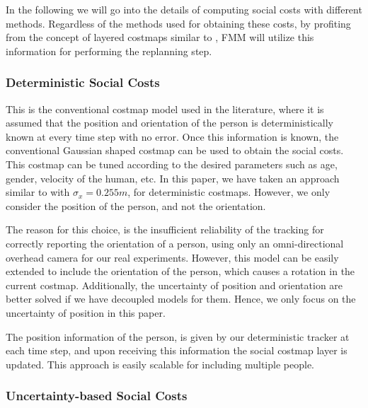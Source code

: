 In the following we will go into the details of computing social costs with different methods. Regardless of the methods used for obtaining these costs, by profiting from the concept of layered costmaps similar to \cite{lu2014iros}, FMM will utilize this information for performing the replanning step. 


\subsubsection{Deterministic Social Costs}

This is the conventional costmap model used in the literature, where it is assumed that the position and orientation of the person is deterministically known at every time step with no error. Once this information is known, the conventional Gaussian shaped costmap can be used to obtain the social costs. This costmap can be tuned according to the desired parameters such as age, gender, velocity of the human, etc. In this paper, we have taken an approach similar to \cite{gomez2013social} with ${\sigma}_{x} = 0.255m $, for deterministic costmaps. However, we only consider the position of the person, and not the orientation.

The reason for this choice, is the insufficient reliability of the tracking for correctly reporting the orientation of a person, using only an omni-directional overhead camera for our real experiments. However, this model can be easily extended to include the orientation of the person, which causes a rotation in the current costmap. Additionally, the uncertainty of position and orientation are better solved if we have decoupled models for them. Hence, we only focus on the uncertainty of position in this paper.

The position information of the person, is given by our deterministic tracker at each time step, and upon receiving this information the social costmap layer is updated. This approach is easily scalable for including multiple people.

\subsubsection{Uncertainty-based Social Costs}

